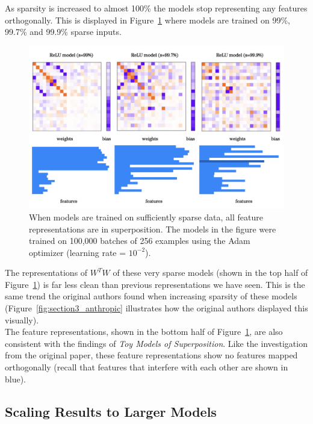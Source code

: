 \documentclass{article} %
\begin{document}
As sparsity is increased to almost 100\% the models stop representing any features
orthogonally. This is displayed in Figure~\ref{fig:sparsity_2} where models are
trained on 99\%, 99.7\% and 99.9\% sparse inputs.

\begin{figure}[h]
    \centering
    \includegraphics[width=0.75\linewidth]{demonstrating_superposition/images/sparsity_superposition2.png}
    \captionsetup{font=footnotesize, width=0.7\linewidth} %
    \caption{
        When models are trained on sufficiently sparse data, all feature
        representations are in superposition. The models in the figure were
        trained on 100,000 batches of 256 examples using the Adam optimizer 
        (learning rate = $10^{-2}$).
    }
    \label{fig:sparsity_2}
\end{figure}

The representations of $W^{T}W$ of these very sparse models (shown in the top
half of Figure~\ref{fig:sparsity_2}) is far less clean than previous
representations we have seen. This is the same trend the original authors
found when increasing sparsity of these models (Figure~\ref{fig:section3_anthropic}
illustrates how the original authors displayed this visually). \\

The feature representations, shown in the bottom half of Figure~\ref{fig:sparsity_2},
are also consistent with the findings of \textit{Toy Models of Superposition}.
Like the investigation from the original paper, these feature representations 
show no features mapped orthogonally (recall that features that interfere with
each other are shown in blue). \\

\subsection{Scaling Results to Larger Models}
\end{document}
